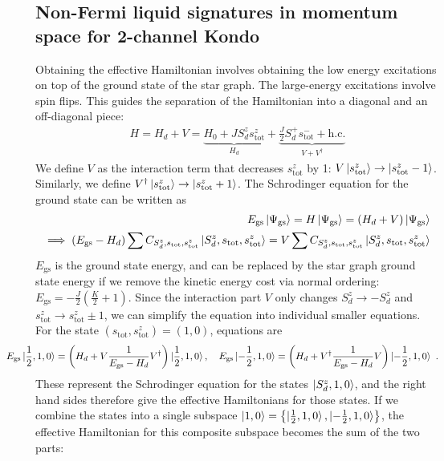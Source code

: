 \documentclass[10pt]{iopart}
\begin{document}
\subsection{Non-Fermi liquid signatures in momentum space for 2-channel Kondo}
Obtaining the effective Hamiltonian involves obtaining the low energy excitations on top of the ground state of the star graph. The large-energy excitations involve spin flips. This guides the separation of the Hamiltonian into a diagonal and an off-diagonal piece:
\begin{eqnarray}
	H = H_d + V = \underbrace{H_0 + J S_d^z s_\text{tot}^z}_{H_d} + \underbrace{\frac{J}{2}S_d^+ s_\text{tot}^- + \text{h.c.}}_{V + V^\dagger}
\end{eqnarray}
We define \(V\) as the interaction term that decreases \(s_\text{tot}^z\) by 1: \(V \ket{s_\text{tot}^z} \to \ket{s_\text{tot}^z - 1}\). Similarly, we define \(V^\dagger \ket{s_\text{tot}^z} \to \ket{s_\text{tot}^z + 1}\). The Schrodinger equation for the ground state can be written as
\begin{eqnarray}
	E_\text{gs}\ket{\Psi_\text{gs}} = H \ket{\Psi_\text{gs}} = \left(H_d + V\right)\ket{\Psi_\text{gs}} \nonumber\\
	\implies \left(E_\text{gs} - H_d\right)\sum C_{S_d^z, s_\text{tot},s_\text{tot}^z}\ket{S_d^z, s_\text{tot}, s_\text{tot}^z} = V\sum C_{S_d^z, s_\text{tot},s_\text{tot}^z}\ket{S_d^z, s_\text{tot}, s_\text{tot}^z}
\end{eqnarray}
\(E_\text{gs}\) is the ground state energy, and can be replaced by the star graph ground state energy if we remove the kinetic energy cost via normal ordering: \(E_\text{gs} = -\frac{J}{2}\left(\frac{K}{2}+1\right) \). Since the interaction part \(V\) only changes \(S_d^z \to -S_d^z\) and \(s^z_\text{tot} \to s^z_\text{tot} \pm 1\), we can simplify the equation into individual smaller equations. For the state \((s_\text{tot},s^z_\text{tot}) = (1,0)\), equations are
\begin{eqnarray}
	\label{eff_ham_Sdz_10}
	\hspace*{-30pt}E_\text{gs} \ket{\frac{1}{2}, 1, 0} = \left(H_d + V \frac{1}{E_\text{gs} - H_d}V^\dagger\right) \ket{\frac{1}{2}, 1, 0}, \quad E_\text{gs} \ket{-\frac{1}{2}, 1, 0} = \left(H_d + V^\dagger \frac{1}{E_\text{gs} - H_d} V\right) \ket{-\frac{1}{2}, 1, 0}~.
\end{eqnarray}
These represent the Schrodinger equation for the states \(\ket{S_d^z, 1, 0}\), and the right hand sides therefore give the effective Hamiltonians for those states. If we combine the states into a single subspace \(\ket{1,0}= \left\{\ket{\frac{1}{2}, 1, 0}, \ket{-\frac{1}{2}, 1, 0}\right\}\), the effective Hamiltonian for this composite subspace becomes the sum of the two parts:
\end{document}
